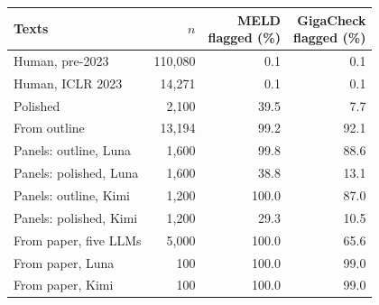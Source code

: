 \begin{tabular}{@{}lrrr@{}}
\toprule
Texts & $n$ & \shortstack[r]{MELD\\flagged (\%)} & \shortstack[r]{GigaCheck\\flagged (\%)} \\
\midrule
Human, pre-2023 & 110,080 & 0.1 & 0.1 \\
Human, ICLR 2023 & 14,271 & 0.1 & 0.1 \\
\midrule
Polished & 2,100 & 39.5 & 7.7 \\
From outline & 13,194 & 99.2 & 92.1 \\
\midrule
Panels: outline, Luna & 1,600 & 99.8 & 88.6 \\
Panels: polished, Luna & 1,600 & 38.8 & 13.1 \\
Panels: outline, Kimi & 1,200 & 100.0 & 87.0 \\
Panels: polished, Kimi & 1,200 & 29.3 & 10.5 \\
\midrule
From paper, five LLMs & 5,000 & 100.0 & 65.6 \\
From paper, Luna & 100 & 100.0 & 99.0 \\
From paper, Kimi & 100 & 100.0 & 99.0 \\
\bottomrule
\end{tabular}
